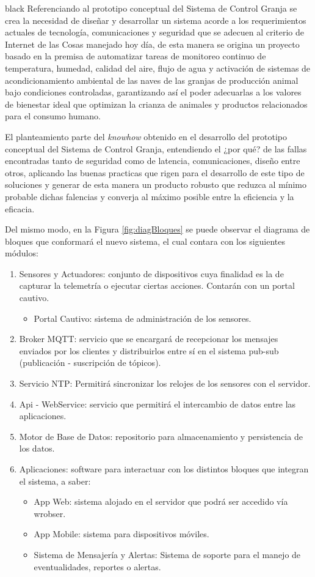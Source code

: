 \documentclass[11pt]{charter}
\begin{document}
\begin{consigna}{black} 
Referenciando al prototipo conceptual del Sistema de Control Granja se crea la necesidad de diseñar y desarrollar un sistema acorde a los requerimientos actuales de tecnología, comunicaciones y seguridad que se adecuen al criterio de Internet de las Cosas manejado hoy día, de esta manera se origina un proyecto basado en la premisa de automatizar tareas de monitoreo continuo de temperatura, humedad, calidad del aire, flujo de agua y activación de sistemas de acondicionamiento ambiental de las naves de las granjas de producción animal bajo condiciones controladas, garantizando así el poder adecuarlas a los valores de bienestar ideal que optimizan la crianza de animales y productos relacionados para el consumo humano. 

El planteamiento parte del \textit{knowhow} obtenido en el desarrollo del prototipo conceptual del Sistema de Control Granja, entendiendo el ¿por qué? de las fallas encontradas tanto de seguridad como de latencia, comunicaciones, diseño entre otros, aplicando las buenas practicas que rigen para el desarrollo de este tipo de soluciones y generar de esta manera un producto robusto que reduzca al mínimo probable dichas falencias y converja al máximo posible entre la eficiencia y la eficacia.

Del mismo modo, en la Figura \ref{fig:diagBloques} se puede observar el diagrama de bloques que conformará el nuevo sistema, el cual contara con los siguientes módulos: 
\begin{enumerate}
\item Sensores y Actuadores: conjunto de dispositivos cuya finalidad es la de capturar la telemetría o ejecutar ciertas acciones. Contarán con un portal cautivo.
\begin{itemize}
\item Portal Cautivo: sistema de administración de los sensores.
\end{itemize}
\item Broker MQTT: servicio que se encargará de recepcionar los mensajes enviados por los clientes y distribuirlos entre sí en el sistema pub-sub (publicación - suscripción de tópicos).
\item Servicio NTP: Permitirá sincronizar los relojes de los sensores con el servidor.
\item Api - WebService: servicio que permitirá el intercambio de datos entre las aplicaciones.
\item Motor de Base de Datos: repositorio para almacenamiento y persistencia de los datos.
\item Aplicaciones: software para interactuar con los distintos bloques que integran el sistema, a saber:
	\begin{itemize}
		\item App Web: sistema alojado en el servidor que podrá ser accedido vía wrobser.
		\item App Mobile: sistema para dispositivos móviles.
		\item Sistema de Mensajería y Alertas: Sistema de soporte para el manejo de eventualidades, reportes o alertas.
	\end{itemize}
\end{enumerate}


\end{consigna}
\end{document}
